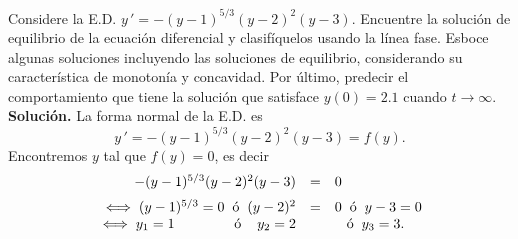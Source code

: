 \documentclass{beamer}
\begin{document}
\begin{frame}[t]
	\vspace{-4mm}
	\begin{example}
		Considere la E.D. \(y\,' =-(y-1) ^{5/3} (y-2) ^2(y-3)\). Encuentre la solución de equilibrio de la ecuación diferencial y clasifíquelos usando la línea fase. Esboce algunas soluciones incluyendo las soluciones de equilibrio, considerando su característica de monotonía y concavidad. Por último, predecir el comportamiento que tiene la solución que satisface \(y(0) =2.1\) cuando \(t \longrightarrow \infty\). \\[2mm]
		\textbf{Solución.} La forma normal de la E.D. es
		\[
			y\,' = -(y-1) ^{5/3} (y-2) ^2(y-3) =f(y).
		\]
		Encontremos \(y\) tal que \(f(y) =0\), es decir
		\[
			\begin{array}{rcl}
				-(y-1) ^{5/3} (y-2) ^2(y-3) & = & 0 \\[2mm]
				\iff (y-1) ^{5/3} =0 \hspace{2mm} \mbox{ó} \hspace{2mm} (y-2) ^2 & = & 0 \hspace{2mm} \mbox{ó} \hspace{2mm} y-3=0 \\
				\iff y_1=1 \hspace{1.5cm} \mbox{ó} \hspace{4mm} y_2=2 && \hspace{3mm} \mbox{ó} \hspace{2mm} y_3=3.
			\end{array}
		\]
	\end{example}
\end{frame}
\end{document}
